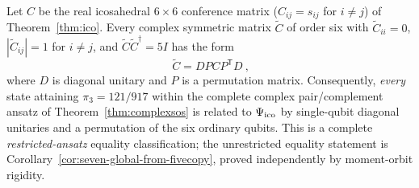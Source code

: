 \begin{proposition}\label{prop:confphase}
Let $C$ be the real icosahedral $6\times6$ conference matrix ($C_{ij}=s_{ij}$ for $i\ne j$) of Theorem~\ref{thm:ico}.
Every complex symmetric matrix $\widetilde C$ of order six with $\widetilde C_{ii}=0$,
$|\widetilde C_{ij}|=1$ for $i\ne j$, and $\widetilde C\widetilde C^\dagger=5I$ has the form
\[
                 \boxed{\ \widetilde C=DPCP^{\mathsf T}D\ },
\]
where $D$ is diagonal unitary and $P$ is a permutation matrix.
Consequently, \emph{every} state attaining $\pi_3=121/917$ within
the complete complex pair/complement ansatz of
Theorem~\ref{thm:complexsos} is related to $\Psi_{\mathrm{ico}}$ by
single-qubit diagonal unitaries and a permutation of the six
ordinary qubits. This is a complete \emph{restricted-ansatz} equality
classification; the unrestricted equality statement is
Corollary~\ref{cor:seven-global-from-fivecopy}, proved independently by
moment-orbit rigidity.
\end{proposition}
